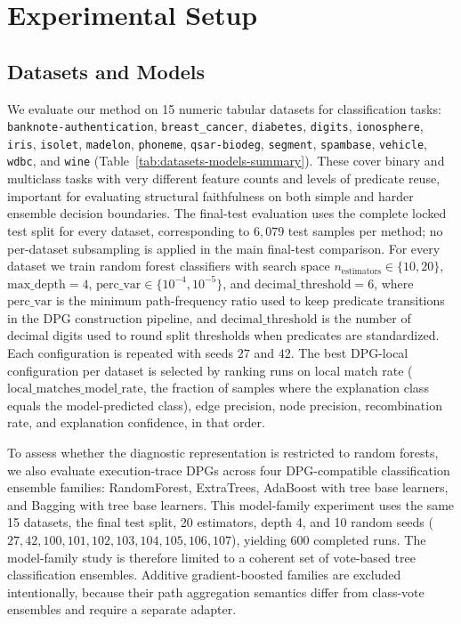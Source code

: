 \documentclass[runningheads]{llncs}
\begin{document}
\section{Experimental Setup}

\subsection{Datasets and Models}
We evaluate our method on 15 numeric tabular  datasets for classification tasks: \texttt{banknote-authentication}, \texttt{breast\_cancer}, \texttt{diabetes}, \texttt{digits}, \texttt{ionosphere}, \texttt{iris}, \texttt{isolet}, \texttt{madelon}, \texttt{phoneme}, \texttt{qsar-biodeg}, \texttt{segment}, \texttt{spambase}, \texttt{vehicle}, \texttt{wdbc}, and \texttt{wine} (Table~\ref{tab:datasets-models-summary}). These cover binary and multiclass tasks with very different feature counts and levels of predicate reuse, important for evaluating structural faithfulness on both simple and harder ensemble decision boundaries. The final-test evaluation uses the complete locked test split for every dataset, corresponding to $6{,}079$ test samples per method; no per-dataset subsampling is applied in the main final-test comparison.
For every dataset we train random forest classifiers with search space $n_{\mathrm{estimators}} \in \{10,20\}$, $\mathrm{max\_depth}=4$, $\mathrm{perc\_var} \in \{10^{-4},10^{-5}\}$, and $\mathrm{decimal\_threshold}=6$, where $\mathrm{perc\_var}$ is the minimum path-frequency ratio used to keep predicate transitions in the DPG construction pipeline, and $\mathrm{decimal\_threshold}$ is the number of decimal digits used to round split thresholds when predicates are standardized. Each configuration is repeated with seeds $27$ and $42$. The best DPG-local configuration per dataset is selected by ranking runs on local match rate ($\mathrm{local\_matches\_model\_rate}$, the fraction of samples where the explanation class equals the model-predicted class), edge precision, node precision, recombination rate, and explanation confidence, in that order.

To assess whether the diagnostic representation is restricted to random forests, we also evaluate execution-trace DPGs across four DPG-compatible classification ensemble families: RandomForest, ExtraTrees, AdaBoost with tree base learners, and Bagging with tree base learners. This model-family experiment uses the same 15 datasets, the final test split, 20 estimators, depth 4, and 10 random seeds ($27,42,100,101,102,103,104,105,106,107$), yielding 600 completed runs. The model-family study is therefore limited to a coherent set of vote-based tree classification ensembles. Additive gradient-boosted families are excluded intentionally, because their path aggregation semantics differ from class-vote ensembles and require a separate adapter.
\end{document}
